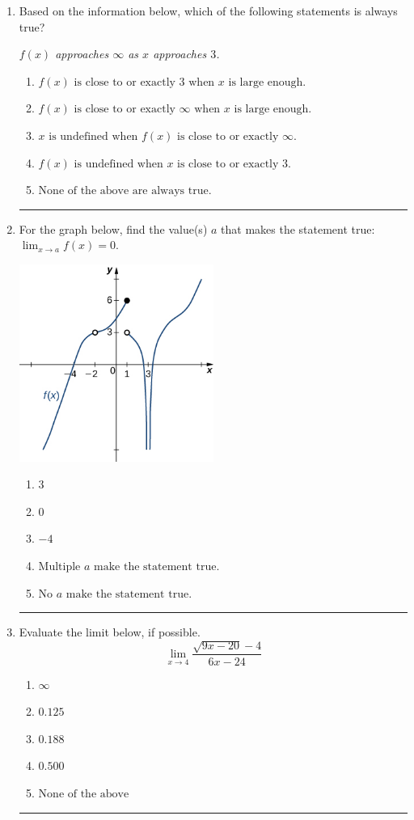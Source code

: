\documentclass[14pt]{extbook}
\newcommand{\litem}[1]{\item#1\hspace*{-1cm}\rule{\textwidth}{0.4pt}}
\begin{document}
\begin{enumerate}
\litem{
Based on the information below, which of the following statements is always true?
\begin{center}
    \textit{ $f(x)$ approaches $\infty$ as $x$ approaches $3$. }
\end{center}
\begin{enumerate}[label=\Alph*.]
\item \( f(x) \text{ is close to or exactly } 3 \text{ when } x \text{ is large enough}. \)
\item \( f(x) \text{ is close to or exactly } \infty \text{ when } x \text{ is large enough}. \)
\item \( x \text{ is undefined when } f(x) \text{ is close to or exactly } \infty. \)
\item \( f(x) \text{ is undefined when } x \text{ is close to or exactly } 3. \)
\item \( \text{None of the above are always true.} \)

\end{enumerate} }
\litem{
For the graph below, find the value(s) $a$ that makes the statement true: $ \displaystyle \lim_{x \rightarrow a} f(x) = 0$.
\begin{center}
    \includegraphics[width=0.5\textwidth]{../Figures/evaluateLimitGraphicallyCopyC.png}
\end{center}
\begin{enumerate}[label=\Alph*.]
\item \( 3 \)
\item \( 0 \)
\item \( -4 \)
\item \( \text{Multiple } a \text{ make the statement true}. \)
\item \( \text{No } a \text{ make the statement true}. \)

\end{enumerate} }
\litem{
Evaluate the limit below, if possible.\[ \lim_{x \rightarrow 4} \frac{\sqrt{9x - 20} - 4}{6x - 24} \]\begin{enumerate}[label=\Alph*.]
\item \( \infty \)
\item \( 0.125 \)
\item \( 0.188 \)
\item \( 0.500 \)
\item \( \text{None of the above} \)


\end{enumerate}}
\end{enumerate}
\end{document}
